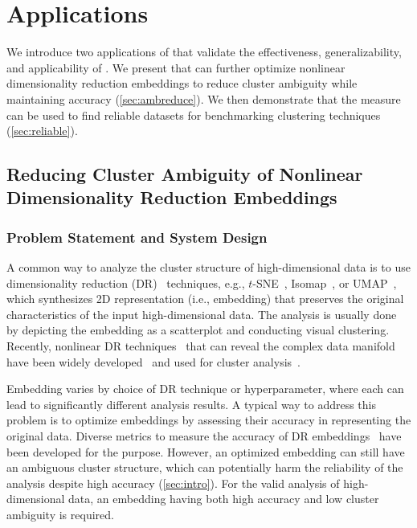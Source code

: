 \section{Applications}
\label{sec:appl}


We introduce two applications of \measure that validate the effectiveness, generalizability, and applicability of \measure.
We present that 
\measure can further optimize nonlinear dimensionality reduction embeddings to reduce cluster ambiguity while maintaining accuracy (\autoref{sec:ambreduce}). 
We then demonstrate that the measure can be used to find reliable datasets for benchmarking clustering techniques (\autoref{sec:reliable}). 


\subsection{Reducing Cluster Ambiguity of Nonlinear Dimensionality Reduction Embeddings}

\label{sec:ambreduce}

\subsubsection{Problem Statement and System Design}

A common way to analyze the cluster structure of high-dimensional data is to use dimensionality reduction (DR)~\cite{nonato19tvcg} techniques, e.g., $t$-SNE~\cite{maaten08jmlr}, Isomap~\cite{tenenbaum00aaas}, or UMAP~\cite{mcinnes2020arxiv}, which synthesizes 2D representation (i.e., embedding) that preserves the original characteristics of the input high-dimensional data. 
The analysis is usually done by depicting the embedding as a scatterplot and conducting visual clustering. 
Recently, nonlinear DR techniques~\cite{lee07springer} that can reveal the complex data manifold have been widely developed~\cite{jeon22vis, fu19kdd,maaten08jmlr, mcinnes2020arxiv} and used for cluster analysis~\cite{becht19nature, fujiwara22arxiv}.  

Embedding varies by choice of DR technique or hyperparameter, where each can lead to significantly different analysis results. A typical way to address this problem is to optimize embeddings by assessing their accuracy in representing the original data. 
Diverse metrics to measure the accuracy of DR embeddings~\cite{jeon22tvcg, lee07springer, nonato19tvcg} have been developed for the purpose. 
However, an optimized embedding can still have an ambiguous cluster structure, which
can potentially harm the reliability of the analysis despite high accuracy (\autoref{sec:intro}). 
For the valid analysis of high-dimensional data, an embedding having both high accuracy and low cluster ambiguity is required.  

